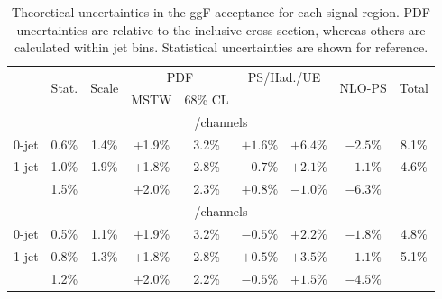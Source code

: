 \begin{table}[b]
	\begin{tabular}{r|ccccccc|c}
		& \multirow{2}{*}{Stat.} & \multirow{2}{*}{Scale} & \multicolumn{2}{c}{PDF} & \multicolumn{2}{c}{PS/Had./UE} & \multirow{2}{*}{NLO-PS} & \multirow{2}{*}{Total} \\
		& & & MSTW & 68\% CL & \pythia{6} & \fherwig & & \\
		\hline
		\multicolumn{9}{c}{\eech/\mmch channels} \\
		\hline
		0-jet   & 0.6\% & 1.4\% & +1.9\% & 3.2\% & $+1.6\%$ & $+6.4\%$ & $-2.5\%$ & 8.1\% \\
		1-jet   & 1.0\% & 1.9\% & +1.8\% & 2.8\% & $-0.7\%$ & $+2.1\%$ & $-1.1\%$ & 4.6\% \\
		\twojet & 1.5\% &       & +2.0\% & 2.3\% & $+0.8\%$ & $-1.0\%$ & $-6.3\%$ &  \\
		\hline
		\multicolumn{9}{c}{\emch/\mech channels} \\
		\hline
		0-jet   & 0.5\% & 1.1\% & +1.9\% & 3.2\% & $-0.5\%$ & $+2.2\%$ & $-1.8\%$ & 4.8\% \\
		1-jet   & 0.8\% & 1.3\% & +1.8\% & 2.8\% & $+0.5\%$ & $+3.5\%$ & $-1.1\%$ & 5.1\% \\
		\twojet & 1.2\% &       & +2.0\% & 2.2\% & $-0.5\%$ & $+1.5\%$ & $-4.5\%$ &  \\
	\end{tabular}
	\caption{Theoretical uncertainties in the ggF acceptance for each signal region. PDF 
	uncertainties are relative to the inclusive cross section, whereas others are 
	calculated within jet bins. Statistical uncertainties are shown for reference.}
	\label{tab:signal:acc_unc_summary}
\end{table}

